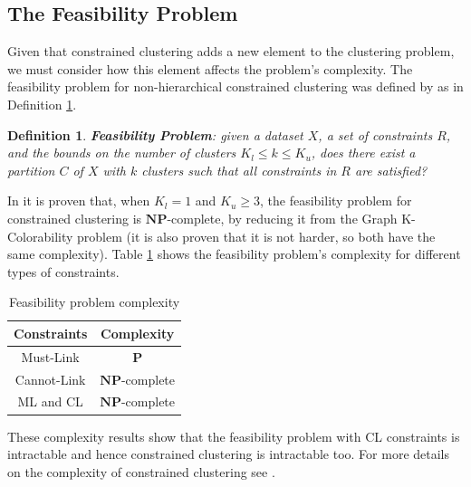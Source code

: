 \documentclass[review]{elsarticle}
\newtheorem{definition}{Definition}
\begin{document}
\subsection{The Feasibility Problem}

Given that constrained clustering adds a new element to the clustering problem, we must consider how this element affects the problem's complexity. The feasibility problem for non-hierarchical constrained clustering was defined by \cite{davidson2005clustering} as in Definition \ref{def1}.

\begin{definition}
	
	\textbf{Feasibility Problem}: given a dataset $X$, a set of constraints $R$, and the bounds on the number of clusters $K_l \leq k \leq K_u$, does there exist a partition $C$ of $X$ with $k$ clusters such that all constraints in $R$ are satisfied? \cite{davidson2007survey}\cite{davidson2005clustering}
	\label{def1}
	
\end{definition}

In \cite{davidson2005clustering} it is proven that, when $K_l = 1$ and $K_u \ge 3$, the feasibility problem for constrained clustering is $\mathbf{NP}$-complete, by reducing it from the Graph K-Colorability problem (it is also proven that it is not harder, so both have the same complexity). Table \ref{tab:feasibility} shows the feasibility problem's complexity for different types of constraints.

\begin{table}[!h]
	\centering
	\setlength{\tabcolsep}{7pt}
	\renewcommand{\arraystretch}{1.2}
		\begin{tabular}{c c}
			\hline
			Constraints & Complexity \\
			\hline
			Must-Link & $\mathbf{P}$\\
			Cannot-Link & $\mathbf{NP}$-complete\\
			ML and CL & $\mathbf{NP}$-complete\\
			\hline
			
		\end{tabular}%
	\caption{Feasibility problem complexity \cite{davidson2005clustering}}
	\label{tab:feasibility}
\end{table}

These complexity results show that the feasibility problem with CL constraints is intractable and hence constrained clustering is intractable too. For more details on the complexity of constrained clustering see \cite{davidson2005clustering}.
\end{document}
